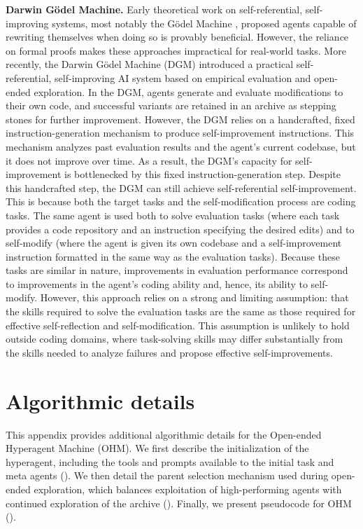 \documentclass[]{fairmeta}
\begin{document}
\textbf{Darwin G\"odel Machine.} Early theoretical work on self-referential, self-improving systems, most notably the G\"odel Machine \citep{schmidhuber2007godel}, proposed agents capable of rewriting themselves when doing so is provably beneficial. However, the reliance on formal proofs makes these approaches impractical for real-world tasks. More recently, the Darwin G\"odel Machine (DGM) \citep{zhang2025darwin} introduced a practical self-referential, self-improving AI system based on empirical evaluation and open-ended exploration. In the DGM, agents generate and evaluate modifications to their own code, and successful variants are retained in an archive as stepping stones for further improvement. However, the DGM relies on a handcrafted, fixed instruction-generation mechanism to produce self-improvement instructions. This mechanism analyzes past evaluation results and the agent's current codebase, but it does not improve over time. As a result, the DGM's capacity for self-improvement is bottlenecked by this fixed instruction-generation step.
Despite this handcrafted step, the DGM can still achieve self-referential self-improvement. This is because both the target tasks and the self-modification process are coding tasks. The same agent is used both to solve evaluation tasks (where each task provides a code repository and an instruction specifying the desired edits) and to self-modify (where the agent is given its own codebase and a self-improvement instruction formatted in the same way as the evaluation tasks). Because these tasks are similar in nature, improvements in evaluation performance correspond to improvements in the agent's coding ability and, hence, its ability to self-modify. However, this approach relies on a strong and limiting assumption: that the skills required to solve the evaluation tasks are the same as those required for effective self-reflection and self-modification. This assumption is unlikely to hold outside coding domains, where task-solving skills may differ substantially from the skills needed to analyze failures and propose effective self-improvements.

\section{Algorithmic details}
\label{app:algo-details}

This appendix provides additional algorithmic details for the Open-ended Hyperagent Machine (OHM). We first describe the initialization of the hyperagent, including the tools and prompts available to the initial task and meta agents (). We then detail the parent selection mechanism used during open-ended exploration, which balances exploitation of high-performing agents with continued exploration of the archive (). Finally, we present pseudocode for OHM ().
\end{document}
